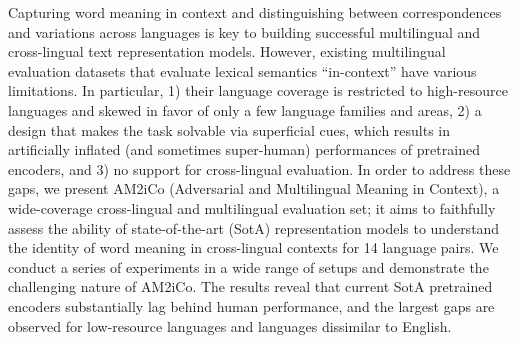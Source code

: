 Capturing word meaning in context and distinguishing between correspondences and variations across languages is key to building successful multilingual and cross-lingual text representation models. However, existing multilingual evaluation datasets that evaluate lexical semantics ``in-context'' have various limitations. In particular,  1) their language coverage is restricted to high-resource languages and skewed in favor of only a few language families and areas, 2) a design that makes the task solvable via superficial cues, which results in artificially inflated (and sometimes super-human) performances of pretrained encoders, and 3) no support for cross-lingual evaluation. In order to address these gaps, we present AM2iCo (Adversarial and Multilingual Meaning in Context), a wide-coverage cross-lingual and multilingual evaluation set; it aims to faithfully assess the ability of state-of-the-art (SotA) representation models to understand the identity of word meaning in cross-lingual contexts for 14 language pairs. We conduct a series of experiments in a wide range of setups and demonstrate the challenging nature of AM2iCo. The results reveal that current SotA pretrained encoders substantially lag behind human performance, and the largest gaps are observed for low-resource languages and languages dissimilar to English.
